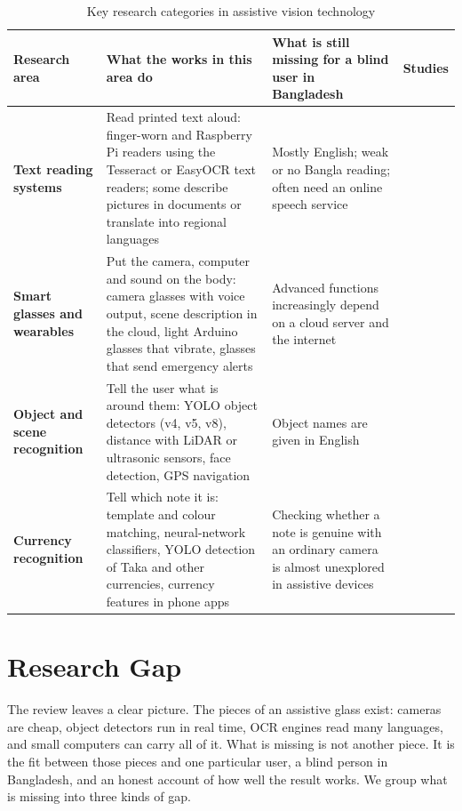 \begin{table}[!htbp]
\centering
\caption{Key research categories in assistive vision technology}
\label{tab:key_areas}
\small
\begin{tabular}{|L{2.6cm}|L{4.8cm}|L{4.0cm}|L{2.6cm}|}
\hline
\textbf{Research area} & \textbf{What the works in this area do} & \textbf{What is still missing for a blind user in Bangladesh} & \textbf{Studies} \\
\hline
\textbf{Text reading systems} & Read printed text aloud: finger-worn and Raspberry Pi readers using the Tesseract or EasyOCR text readers; some describe pictures in documents or translate into regional languages & Mostly English; weak or no Bangla reading; often need an online speech service & \cite{fingerreader2014,assistreading2014,readingaid_rpi2023,visionvoice2024,cameraocr2023,itra2022,dlreader2022} \\
\hline
\textbf{Smart glasses and wearables} & Put the camera, computer and sound on the body: camera glasses with voice output, scene description in the cloud, light Arduino glasses that vibrate, glasses that send emergency alerts & Advanced functions increasingly depend on a cloud server and the internet & \cite{studentglass2017,smartglass_mdpi2021,googleglass2021,airis2024,thirdeye2019,lightweight_glass2025,smartglass_vip2025} \\
\hline
\textbf{Object and scene recognition} & Tell the user what is around them: YOLO object detectors (v4, v5, v8), distance with LiDAR or ultrasonic sensors, face detection, GPS navigation & Object names are given in English & \cite{echolight2025,aiblind2025,voicereading2025,ivsmart2024,navassist2024,ai_nlp2025} \\
\hline
\textbf{Currency recognition} & Tell which note it is: template and colour matching, neural-network classifiers, YOLO detection of Taka and other currencies, currency features in phone apps & Checking whether a note is genuine with an ordinary camera is almost unexplored in assistive devices & \cite{currency2017,currency2023,axissym,nstubdtaka2024,yolov8nse,blindassist2021,divyadrishti2021} \\
\hline
\end{tabular}
\end{table}
\FloatBarrier

\section{Research Gap}
\label{sec:gap}
The review leaves a clear picture. The pieces of an assistive glass exist: cameras are cheap, object detectors run in real time, OCR engines read many languages, and small computers can carry all of it. What is missing is not another piece. It is the fit between those pieces and one particular user, a blind person in Bangladesh, and an honest account of how well the result works. We group what is missing into three kinds of gap.

